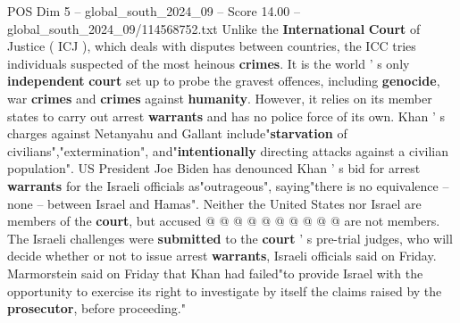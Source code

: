 \begin{textsample}{POS Dim 5 – global\_south\_2024\_09 – Score 14.00 – global\_south\_2024\_09/114568752.txt}
Unlike the \textbf{International} \textbf{Court} of Justice ( ICJ ), which deals with disputes between countries, the ICC tries individuals suspected of the most heinous \textbf{crimes}.
It is the world ' s only \textbf{independent} \textbf{court} set up to probe the gravest offences, including \textbf{genocide}, war \textbf{crimes} and \textbf{crimes} against \textbf{humanity}.
However, it relies on its member states to carry out arrest \textbf{warrants} and has no police force of its own.
Khan ' s charges against Netanyahu and Gallant include"\textbf{starvation} of civilians","extermination", and"\textbf{intentionally} directing attacks against a civilian population".
US President Joe Biden has denounced Khan ' s bid for arrest \textbf{warrants} for the Israeli officials as"outrageous", saying"there is no equivalence -- none -- between Israel and Hamas".
Neither the United States nor Israel are members of the \textbf{court}, but accused @ @ @ @ @ @ @ @ @ @ are not members.
The Israeli challenges were \textbf{submitted} to the \textbf{court} ' s pre-trial judges, who will decide whether or not to issue arrest \textbf{warrants}, Israeli officials said on Friday.
Marmorstein said on Friday that Khan had failed"to provide Israel with the opportunity to exercise its right to investigate by itself the claims raised by the \textbf{prosecutor}, before proceeding."

\end{textsample}
